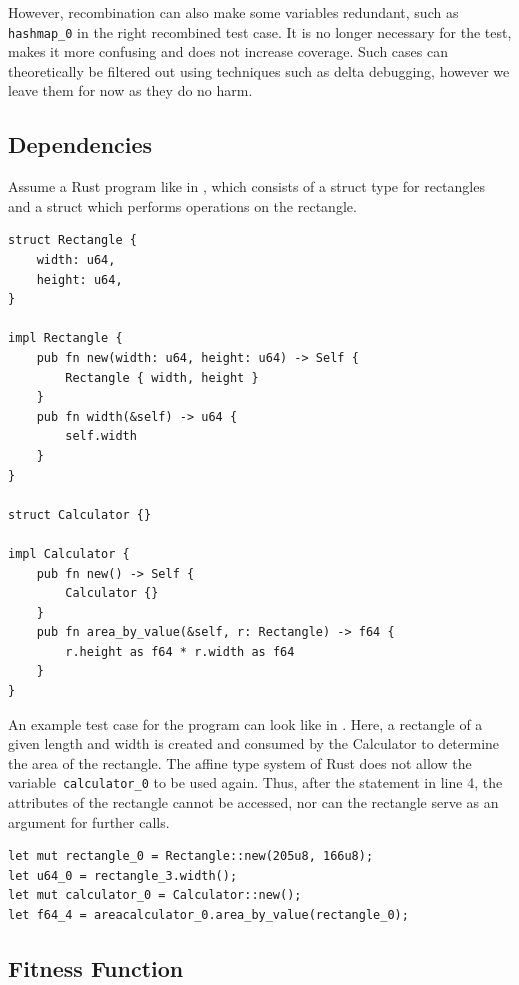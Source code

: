 \documentclass[paper=a4,%
  twoside,%
  BCOR4mm,%
  abstract=true,%
  toc=bibliography,%
  chapterprefix=true,%
  toc=bibliographynumbered,%
  open=right,%
  english,%
  pagesize=pdftex]{scrreprt}
\begin{document}
However, recombination can also make some variables redundant, such as \texttt{hashmap\string_0} in the right recombined test case. It is no longer necessary for the test, makes it more confusing and does not increase coverage. Such cases can theoretically be filtered out using techniques such as delta debugging, however we leave them for now as they do no harm.

\subsection{Dependencies}
Assume a Rust program like in , which consists of a struct type for rectangles and a struct which performs operations on the rectangle.
\begin{lstlisting}[style=boxed, caption={Rectangle data type}, label=lst:example-rust-program]
struct Rectangle {
    width: u64,
    height: u64,
}

impl Rectangle {
    pub fn new(width: u64, height: u64) -> Self {
        Rectangle { width, height }
    }
    pub fn width(&self) -> u64 {
        self.width
    }
}

struct Calculator {}

impl Calculator {
    pub fn new() -> Self {
        Calculator {}
    }
    pub fn area_by_value(&self, r: Rectangle) -> f64 {
        r.height as f64 * r.width as f64
    }
}
\end{lstlisting}

An example test case for the program can look like in . Here, a rectangle of a given length and width is created and consumed by the Calculator to determine the area of the rectangle. The affine type system of Rust does not allow the variable~\texttt{calculator\string_0} to be used again. Thus, after the statement in line 4, the attributes of the rectangle cannot be accessed, nor can the rectangle serve as an argument for further calls.

\begin{lstlisting}[style=boxed, caption={An example test case generated for the program in \Cref{lst:example-rust-program}}, label=lst:example-testcase]
let mut rectangle_0 = Rectangle::new(205u8, 166u8);
let u64_0 = rectangle_3.width();
let mut calculator_0 = Calculator::new();
let f64_4 = areacalculator_0.area_by_value(rectangle_0);
\end{lstlisting}


\subsection{Fitness Function}
\end{document}
